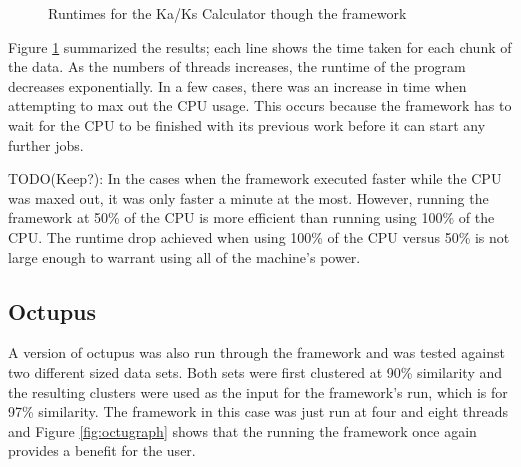 \documentclass[12pt]{article}
\begin{document}
\begin{figure}
{}
\caption{Runtimes for the Ka/Ks Calculator though the framework}
\label{fig:kaksgraph}
\end{figure}

Figure \ref{fig:kaksgraph} summarized the results; each line shows the time
taken for each chunk of the data. As the numbers of threads increases, the
runtime of the program decreases exponentially. In a few cases, there was an
increase in time when attempting to max out the CPU usage. This occurs because
the framework has to wait for the CPU to be finished with its previous work
before it can start any further jobs. 

TODO(Keep?): In the cases when the framework executed faster while the CPU was 
maxed out, it was only faster a minute at the most. However, running the 
framework at 50\% of the CPU is more efficient than running using 100\% of the 
CPU. The runtime drop achieved when using 100\% of the CPU versus 50\% is not 
large enough to warrant using all of the machine's power.

\subsection{Octupus}

A version of octupus was also run through the framework and was tested against
two different sized data sets. Both sets were first clustered at 90\% similarity
and the resulting clusters were used as the input for the framework's run, which
is for 97\% similarity. The framework in this case was just run at four and
eight threads and Figure \ref{fig:octugraph} shows that the running the
framework once again provides a benefit for the user.
\end{document}

